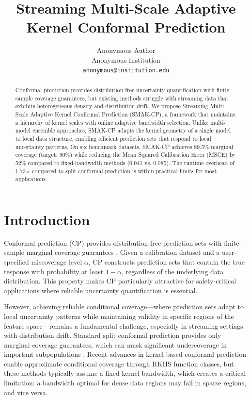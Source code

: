 \documentclass{article}
\title{Streaming Multi-Scale Adaptive Kernel Conformal Prediction}
\author{%
  Anonymous Author\\
  Anonymous Institution\\
  \texttt{anonymous@institution.edu}
}
\theoremstyle{definition}
\begin{document}
\maketitle

\begin{abstract}
Conformal prediction provides distribution-free uncertainty quantification with finite-sample coverage guarantees, but existing methods struggle with streaming data that exhibits heterogeneous density and distribution drift. We propose Streaming Multi-Scale Adaptive Kernel Conformal Prediction (SMAK-CP), a framework that maintains a hierarchy of kernel scales with online adaptive bandwidth selection. Unlike multi-model ensemble approaches, SMAK-CP adapts the kernel geometry of a single model to local data structure, enabling efficient prediction sets that respond to local uncertainty patterns. On six benchmark datasets, SMAK-CP achieves 89.5\% marginal coverage (target: 90\%) while reducing the Mean Squared Calibration Error (MSCE) by 52\% compared to fixed-bandwidth methods (0.041 vs. 0.085). The runtime overhead of 1.73$\times$ compared to split conformal prediction is within practical limits for most applications.
\end{abstract}

\section{Introduction}

Conformal prediction (CP) provides distribution-free prediction sets with finite-sample marginal coverage guarantees \citep{vovk2005algorithmic, angelopoulos2021gentle}. Given a calibration dataset and a user-specified miscoverage level $\alpha$, CP constructs prediction sets that contain the true response with probability at least $1-\alpha$, regardless of the underlying data distribution. This property makes CP particularly attractive for safety-critical applications where reliable uncertainty quantification is essential.

However, achieving reliable conditional coverage---where prediction sets adapt to local uncertainty patterns while maintaining validity in specific regions of the feature space---remains a fundamental challenge, especially in streaming settings with distribution drift. Standard split conformal prediction provides only marginal coverage guarantees, which can mask significant undercoverage in important subpopulations \citep{barber2023limits}. Recent advances in kernel-based conformal prediction \citep{gibbs2023conformal} enable approximate conditional coverage through RKHS function classes, but these methods typically assume a fixed kernel bandwidth, which creates a critical limitation: a bandwidth optimal for dense data regions may fail in sparse regions, and vice versa.
\end{document}
